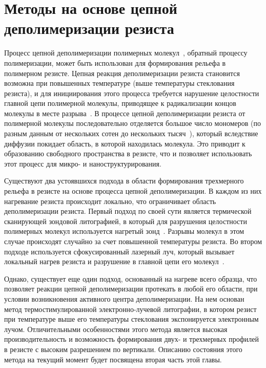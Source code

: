 \section{Методы на основе цепной деполимеризации резиста}
Процесс цепной деполимеризации полимерных молекул~\cite{depol_general_1}, обратный процессу полимеризации, может быть использован для формирования рельефа в полимерном резисте. Цепная реакция деполимеризации резиста становится возможна при повышенных температуре (выше температуры стеклования резиста), и для инициирования этого процесса требуется нарушение целостности главной цепи полимерной молекулы, приводящее к радикализации концов молекулы в месте разрыва~\cite{depol_general_2}. В процессе цепной деполимеризации резиста от полимерной молекулы последовательно отделяется большое число мономеров (по разным данным от нескольких сотен до нескольких тысяч~\cite{Madorsky, Mita_PMMA_zip_lengths_T, Inaba_zip_len}), который вследствие диффузии покидает область, в которой находилась молекула. Это приводит к образованию свободного пространства в резисте, что и позволяет использовать этот процесс для микро- и наноструктурирования.

Существуют два устоявшихся подхода в области формирования трехмерного рельефа в резисте на основе процесса цепной деполимеризации. В каждом из них нагревание резиста происходит локально, что ограничивает область деполимеризации резиста. Первый подход по своей сути является термической сканирующей зондовой литографией, в который для разрушения целостности полимерных молекул используется нагретый зонд~\cite{depol_fabrication_probe}. Разрывы молекул в этом случае происходят случайно за счет повышенной температуры резиста. Во втором подходе используется сфокусированный лазерный луч, который вызывает локальный нагрев резиста и разрушение в главной цепи его молекул~\cite{depol_fabrication_laser}.

Однако, существует еще один подход, основанный на нагреве всего образца, что позволяет реакции цепной деполимеризации протекать в любой его области, при условии возникновения активного центра деполимеризации. На нем основан метод термостимулированной электронно-лучевой литографии, в котором резист при температуре выше его температуры стеклования экспонируется электронным лучом. Отличительными особенностями этого метода является высокая производительность и возможность формирования двух- и трехмерных профилей в резисте с высоким разрешением по вертикали. Описанию состояния этого метода на текущий момент будет посвящена вторая часть этой главы.








